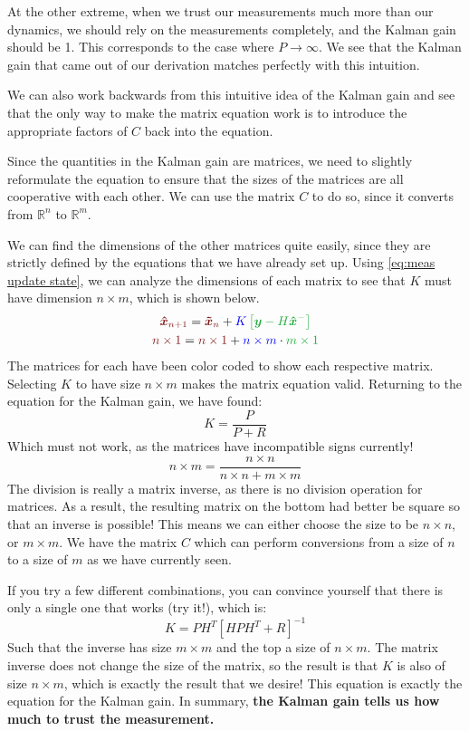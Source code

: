 At the other extreme, when we trust our measurements much more than our dynamics, we should rely on the measurements completely, and the Kalman gain should be 1. This corresponds to the case where $P\rightarrow\infty$. We see that the Kalman gain that came out of our derivation matches perfectly with this intuition.

We can also work backwards from this intuitive idea of the Kalman gain and see that the only way to make the matrix equation work is to introduce the appropriate factors of $C$ back into the equation.

Since the quantities in the Kalman gain are matrices, we need to slightly reformulate the equation to ensure that the sizes of the matrices are all cooperative with each other. We can use the matrix $C$ to do so, since it converts from $\mathbb{R}^n$ to $\mathbb{R}^m$. 

We can find the dimensions of the other matrices quite easily, since they are strictly defined by the equations that we have already set up. Using \autoref{eq:meas update state}, we can analyze the dimensions of each matrix to see that $K$ must have dimension $n\times m$, which is shown below.
\begin{gather}
        \color{maroon}\bm{\hat{x}}_{n+1}\color{black}=\color{maroon}\bm{\tilde{x}}_n\color{black}+\color{blue}K
        \color{black}\color{linkgreen}\left[\bm{y}-H\bm{\hat{x}}^-\right]\\
        \color{maroon}n\times1\color{black}=\color{maroon}n\times1\color{black}+\color{blue}n\times m\color{black}\cdot\color{linkgreen} m\times 1
\end{gather}
The matrices for each have been color coded to show each respective matrix. Selecting $K$ to have size $n\times m$ makes the matrix equation valid. Returning to the equation for the Kalman gain, we have found:
$$K=\frac{P}{P+R}$$
Which must not work, as the matrices have incompatible signs currently!
$$n\times m=\frac{n\times n}{n\times n+m\times m}$$
The division is really a matrix inverse, as there is no division operation for matrices. As a result, the resulting matrix on the bottom had better be square so that an inverse is possible! This means we can either choose the size to be $n\times n$, or $m\times m$. We have the matrix $C$ which can perform conversions from a size of $n$ to a size of $m$ as we have currently seen.

If you try a few different combinations, you can convince yourself that there is only a single one that works (try it!), which is:
$$K=PH^T[HPH^T+R]^{-1}$$
Such that the inverse has size $m\times m$ and the top a size of $n\times m$. The matrix inverse does not change the size of the matrix, so the result is that $K$ is also of size $n\times m$, which is exactly the result that we desire! This equation is exactly the equation for the Kalman gain. In summary, \textbf{the Kalman gain tells us how much to trust the measurement.} 

